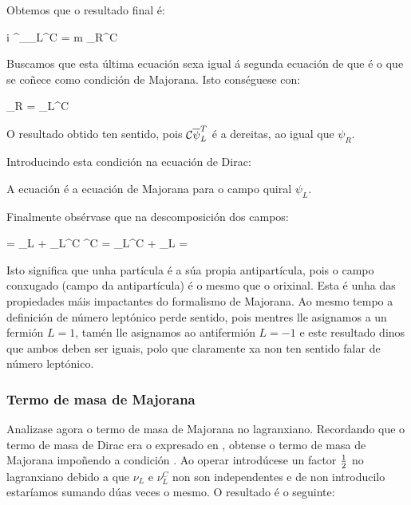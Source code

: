 \documentclass[a4paper,12pt]{article}
\begin{document}
Obtemos que o resultado final é:

\beq
 i \gamma^\mu \partial_\mu \psi_L^C  = m \psi_R^C
\eeq

Buscamos que esta última ecuación sexa igual á segunda ecuación de  que é o que se coñece como condición de Majorana. Isto conséguese con:

\beq\label{condmajorana}
\psi_R = \psi_L^C
\eeq

O resultado obtido ten sentido, pois $\mathcal{C} \overline{\psi}_L^T$ é a dereitas, ao igual que $\psi_R$.

Introducindo esta condición na ecuación de Dirac:
 
\beq\label{ecmajorana}
\ebx
\eeq

A ecuación  é a ecuación de Majorana para o campo quiral $\psi_L$.

 Finalmente obsérvase que na descomposición dos campos:

\beq
\psi = \psi_L + \psi_L^C \rightarrow \psi^C = \psi_L^C + \psi_L = \psi
\eeq
 
Isto significa que unha partícula é a súa propia antipartícula, pois o campo conxugado (campo da antipartícula) é o mesmo que o orixinal. Esta é unha das propiedades máis impactantes do formalismo de Majorana. Ao mesmo tempo a definición de número leptónico perde sentido, pois mentres lle asignamos a un fermión $L=1$, tamén lle asignamos ao antifermión $L=-1$ e este resultado dinos que ambos deben ser iguais, polo que claramente xa non ten sentido falar de número leptónico.

\subsubsection{Termo de masa de Majorana}

Analizase agora o termo de masa de Majorana no lagranxiano. Recordando que o termo de masa de Dirac era o expresado en , obtense o termo de masa de Majorana impoñendo a condición . Ao operar introdúcese un factor $\frac{1}{2}$ no lagranxiano debido a que $\nu_L$ e $\nu_L^C$ non son independentes e de non introducilo estaríamos sumando dúas veces o mesmo. O resultado é o seguinte:
\end{document}
